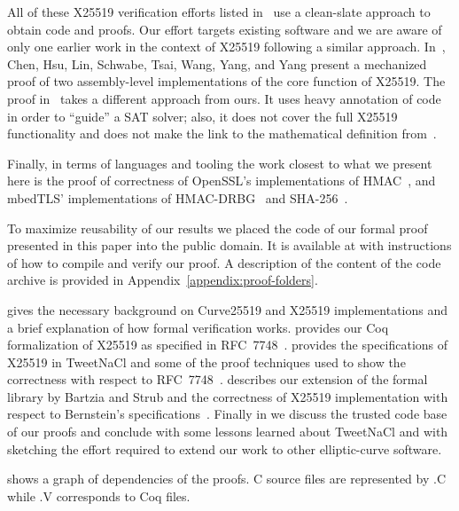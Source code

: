 All of these X25519 verification efforts listed in~\cite{BBB+19} use a clean-slate
approach to obtain code and proofs.
Our effort targets existing software and we are aware of only one earlier
work in the context of X25519 following a similar approach.
In~\cite{Chen2014VerifyingCS}, Chen, Hsu, Lin, Schwabe, Tsai, Wang, Yang, and Yang present
a mechanized proof of two assembly-level implementations of the core function of X25519.
The proof in~\cite{Chen2014VerifyingCS} takes a different approach from ours.
It uses heavy annotation of code in order to ``guide'' a SAT solver;
also, it does not cover the full X25519 functionality and does
not make the link to the mathematical definition from~\cite{Ber06}.

Finally, in terms of languages and tooling the work closest to what we present here
is the proof of correctness of OpenSSL's
implementations of HMAC~\cite{Beringer2015VerifiedCA},
and mbedTLS' implementations of
HMAC-DRBG~\cite{2017-Ye} and SHA-256~\cite{2015-Appel}.

To maximize reusability of our results we placed the code of our formal proof
presented in this paper into the public domain.
It is available at 
with instructions of how to compile and verify our proof.
A description of the content of the code archive is provided in
Appendix~\ref{appendix:proof-folders}.

 gives the necessary background on Curve25519 and X25519
implementations and a brief explanation of how formal verification works.
 provides our Coq formalization of X25519 as specified in RFC~7748~\cite{rfc7748}.
 provides the specifications of X25519 in TweetNaCl and some of the
proof techniques used to show the correctness with respect to RFC~7748~\cite{rfc7748}.
 describes our extension of the formal library by Bartzia
and Strub and the correctness of X25519 implementation with respect to Bernstein's
specifications~\cite{Ber14}.
Finally in  we discuss the trusted code base of our proofs
and conclude with some lessons learned about TweetNaCl and with sketching the
effort required to extend our work to other elliptic-curve software.

 shows a graph of dependencies of the proofs.
C source files are represented by {\color{doc@lstfunctions}.C} while
{\color{doc@lstfunctions}.V} corresponds to Coq files.


